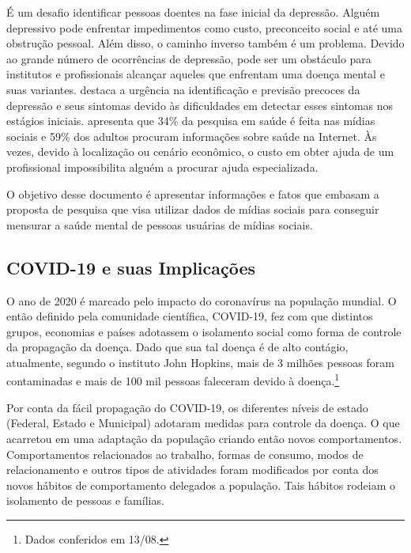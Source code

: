\documentclass[11pt, notitlepage]{article} %
\begin{document}
É um desafio identificar pessoas doentes na fase inicial da depressão. Alguém depressivo pode enfrentar impedimentos como custo, preconceito social e até uma obstrução pessoal. Além disso, o caminho inverso também é um problema. Devido ao grande número de ocorrências de depressão, pode ser um obstáculo para institutos e profissionais alcançar aqueles que enfrentam uma doença mental e suas variantes. \cite{Lech2014} destaca a urgência na identificação e previsão precoces da depressão e seus sintomas devido às dificuldades em detectar esses sintomas nos estágios iniciais. \cite{elkin2008america} apresenta que 34\% da pesquisa em saúde é feita nas mídias sociais e 59\% dos adultos procuram informações sobre saúde na Internet.
Às vezes, devido à localização ou cenário econômico, o custo em obter ajuda de um profissional impossibilita alguém a procurar ajuda especializada.

O objetivo desse documento é apresentar informações e fatos que embasam a proposta de pesquisa que visa utilizar dados de mídias sociais para conseguir mensurar a saúde mental de pessoas usuárias de mídias sociais.

\subsection*{COVID-19 e suas Implicações}
O ano de 2020 é marcado pelo impacto do coronavírus na população mundial. O então definido pela comunidade científica, COVID-19, fez com que distintos grupos, economias e países adotassem o isolamento social como forma de controle da propagação da doença. Dado que sua tal doença é de alto contágio, atualmente, segundo o instituto John Hopkins, mais de 3 milhões pessoas foram contaminadas e mais de 100 mil pessoas faleceram devido à doença.\footnote{Dados conferidos em 13/08.}

Por conta da fácil propagação do COVID-19, os diferentes níveis de estado (Federal, Estado e Municipal) adotaram medidas para controle da doença. O que acarretou em uma adaptação da população criando então novos comportamentos. 
Comportamentos relacionados ao trabalho, formas de consumo, modos de relacionamento e outros tipos de atividades foram modificados por conta dos novos hábitos de comportamento delegados a população. Tais hábitos rodeiam o isolamento de pessoas e famílias. 
\end{document}
